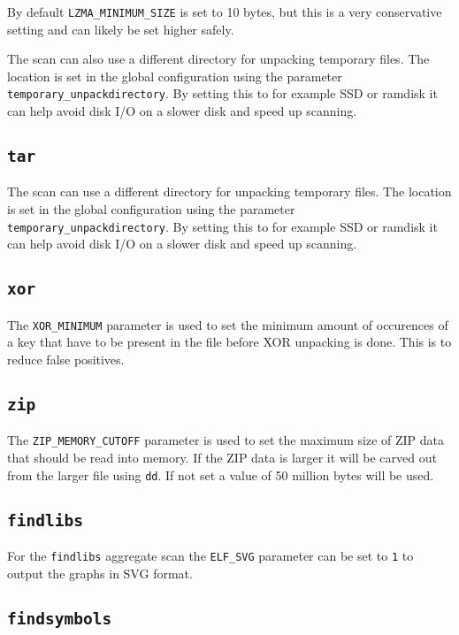 \documentclass[10pt,a4paper]{article}
\begin{document}
By default \texttt{LZMA\_MINIMUM\_SIZE} is set to 10 bytes, but this is a very
conservative setting and can likely be set higher safely.

The scan can also use a different directory for unpacking temporary files.
The location is set in the global configuration using the parameter
\texttt{temporary\_unpackdirectory}. By setting this to for example SSD or
ramdisk it can help avoid disk I/O on a slower disk and speed up scanning.

\subsection{\texttt{tar}}

The scan can use a different directory for unpacking temporary files.
The location is set in the global configuration using the parameter
\texttt{temporary\_unpackdirectory}. By setting this to for example SSD or
ramdisk it can help avoid disk I/O on a slower disk and speed up scanning.

\subsection{\texttt{xor}}

The \texttt{XOR\_MINIMUM} parameter is used to set the minimum amount of
occurences of a key that have to be present in the file before XOR unpacking
is done. This is to reduce false positives.

\subsection{\texttt{zip}}

The \texttt{ZIP\_MEMORY\_CUTOFF} parameter is used to set the maximum size
of ZIP data that should be read into memory. If the ZIP data is larger it will
be carved out from the larger file using \texttt{dd}. If not set a value of 50
million bytes will be used.

\subsection{\texttt{findlibs}}

For the \texttt{findlibs} aggregate scan the \texttt{ELF\_SVG} parameter can be
set to \texttt{1} to output the graphs in SVG format.

\subsection{\texttt{findsymbols}}
\end{document}
